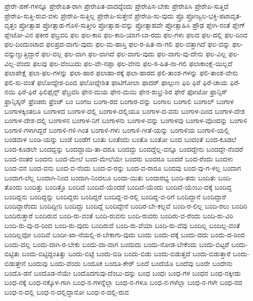{ಪ್ರೇರೇ-ಪಣೆ-ಗಳನ್ನೂ
ಪ್ರೇರೇಪಿತ-ರಾಗಿ
ಪ್ರೇರೇಪಿತ-ವಾದದ್ದೆಂದು
ಪ್ರೇರೇಪಿಸ-ಬೇಕು
ಪ್ರೇರೇಪಿಸಿ
ಪ್ರೇರೇಪಿ-ಸುತ್ತಿದೆ
ಪ್ರೇರೇಪಿ-ಸುತ್ತಿ-ರುವ-ವಳು
ಪ್ರೇರೇಪಿ-ಸುತ್ತಿಲ್ಲ
ಪ್ರೇರೇಪಿ-ಸುತ್ತೇನೆ
ಪ್ರೇರೇಪಿ-ಸು-ವುದು
ಪ್ರೊ
ಪ್ರೋಜ್ವಲ-ಭಕ್ತಿ-ಪಟಾವೃತ-ವೃತ್ತಂ
ಪ್ರೋತ್ಸಾಹ
ಪ್ರೋತ್ಸಾಹ-ಗೊಳಿ-ಸುತ್ತೀರಿ
ಪ್ರೋತ್ಸಾಹ-ವನ್ನು
ಪ್ರೋತ್ಸಾಹವೇ
ಪ್ರೋತ್ಸಾಹಿಸಿ
ಪ್ರೌಢ
ಪ್ಲೇಗಿ-ನಂತೆ
ಪ್ಲೇಗ್
ಪ್ಲೇಟೋ-ವಿನ
ಫಕೀರ
ಫಬ್ರವರಿ
ಫಲ
ಫಲ-ಕಾರಿ
ಫಲ-ಕಾರಿ-ಯಾಗ-ಬಾ-ರದು
ಫಲ-ಗಳು
ಫಲದ
ಫಲ-ದಲ್ಲಿ
ಫಲ-ದಿಂದ
ಫಲ-ದಿಂದುಂಟಾದ
ಫಲಪ್ರದ-ವಾಗು-ವುದು
ಫಲ-ಮ-ಹಾಸ್ತಿ
ಫಲ-ರ-ಹಿತ-ನಾ-ಗಲಿ
ಫಲ-ವತ್ತಾಗಿದೆ
ಫಲ-ವನ್ನು
ಫಲ-ವನ್ನುಣ್ಣುತ್ತಿದ್ದಾರೆ
ಫಲ-ವಲ್ಲ
ಫಲ-ವಾಗಿ
ಫಲ-ವಾಗಿದೆ
ಫಲ-ವಾಗು-ವುದು
ಫಲ-ವಾಗು-ವು-ದೇನು
ಫಲ-ವಿಲ್ಲ
ಫಲ-ವಿಲ್ಲ-ವೆಂದು
ಫಲವು
ಫಲ-ವೆಂಬುದು
ಫಲ-ವೇ-ನಪ್ಪಾ
ಫಲ-ವೇನು
ಫಲ-ಸ-ಹಿತ-ನಾ-ಗಲಿ
ಫಲಾಕಾಂಕ್ಷೆ-ಯಿಲ್ಲದೆ
ಫಲಾಪೇಕ್ಷೆ
ಫಲಾ-ಫಲ-ಗಳನ್ನು
ಫಲಾ-ಹಾರ
ಫಲಾಹಾ-ರಕ್ಕೆ
ಫಲಾ-ಹಾರದ
ಫಲಿ-ತಾಂಶ-ಗಳನ್ನು
ಫಲಿ-ತಾಂಶ-ವೇನು
ಫಲಿ-ಸು-ವಂತೆ
ಫಲೋದ್ದೇಶ-ದಿಂದ
ಫಲೋದ್ದೇಶಿತ
ಫಾಟಿಗೋಲಾ
ಫಾದರ್
ಫಾಲ್ಗುಣ
ಫಿರಿ
ಫಿರೆ
ಫಿರೆ-ಚಾಯ
ಫಿರೆ-ನಯಿ
ಫಿರೆ-ಫಿರೆ
ಫಿಲಿಫೈನ್ಸ್
ಫೆಬ್ರವರಿ
ಫೇನ-ಮಯ
ಫೇನ-ಮಯಿ
ಫೇನ-ಶುಭ್ರ-ಶಿರ
ಫೇರೆ
ಫೋಟೋ
ಫ್ರಾನ್ಸಿಸ್
ಫ್ರಾನ್ಸಿಸ್ಕನ್
ಫ್ರೆಂಚರು
ಫ್ರೆಂಚ್
ಬಂ
ಬಂಗಜ
ಬಂಗಾ-ರದ
ಬಂಗಾರ-ವನ್ನು
ಬಂಗಾಲ
ಬಂಗಾಲಿ
ಬಂಗಾಲ್
ಬಂಗಾಳ
ಬಂಗಾಳಕ್ಕಿಂತಲೂ
ಬಂಗಾಳದ
ಬಂಗಾಳ-ದಲ್ಲಿ
ಬಂಗಾಳ-ದಲ್ಲಿಯೂ
ಬಂಗಾಳ-ದ-ವನು
ಬಂಗಾಳ-ದಿಂದ
ಬಂಗಾಳ-ದೇಶ
ಬಂಗಾಳ-ದೇಶ-ದಲ್ಲಿ
ಬಂಗಾಳನ
ಬಂಗಾಳ-ನಿಗೆ
ಬಂಗಾಳನು
ಬಂಗಾಳ-ವನ್ನು
ಬಂಗಾಳವು
ಬಂಗಾಳ-ವೊಂದನ್ನು
ಬಂಗಾಳಿ
ಬಂಗಾಳಿ-ಗಳಾಗಿದ್ದರೆ
ಬಂಗಾಳಿ-ಗಳಿ-ಗಿಂತ
ಬಂಗಾಳಿ-ಗಳು
ಬಂಗಾಳಿ-ಗೀತೆ-ಯನ್ನು
ಬಂಗಾಳಿಯ
ಬಂಗಾಳಿ-ಯಲ್ಲಿ
ಬಂಡವಾಳ
ಬಂಡಿ-ಯನ್ನು
ಬಂಡೆ
ಬಂಡೆಗೆ
ಬಂತು
ಬಂತೆಂದು
ಬಂತೊ
ಬಂತೋ
ಬಂದ
ಬಂದಂತೆ
ಬಂದ-ಕೂಡಲೆ
ಬಂದ-ಕೂಡಲೇ
ಬಂದದ್ದನ್ನು
ಬಂದದ್ದಾಯಿ-ತಾ-ದರೂ
ಬಂದದ್ದು
ಬಂದದ್ದೆಲ್ಲ-ವನ್ನೂ
ಬಂದದ್ದೇನು
ಬಂದದ್ದೇ-ನೆಂದರೆ
ಬಂದ-ನಂತರ
ಬಂದನು
ಬಂದ-ಮೇಲೆ
ಬಂದ-ಮೇಲೆಯೇ
ಬಂದರು
ಬಂದರೂ
ಬಂದರೆ
ಬಂದ-ರೆಂದು
ಬಂದಳು
ಬಂದ-ವನ
ಬಂದ-ವನು
ಬಂದ-ವ-ನೆಂದು
ಬಂದ-ವ-ರನ್ನು
ಬಂದ-ವ-ರಾರೂ
ಬಂದವು
ಬಂದ-ವು-ಗ-ಳಲ್ಲ
ಬಂದಾಗ
ಬಂದಾಗ-ಲೆಲ್ಲ
ಬಂದಾಗಿ-ನಿಂದ
ಬಂದಾಗಿ-ನಿಂದಲೂ
ಬಂದಾ-ಯಿತು
ಬಂದಾರಭ್ಯ
ಬಂದಿ-ತದು
ಬಂದಿತು
ಬಂದಿ-ತೊಂದು
ಬಂದಿತ್ತು
ಬಂದಿತ್ತೊ
ಬಂದಿದೆ
ಬಂದಿದೆ-ಯೆಂದರೆ
ಬಂದಿದೆ-ಯೆಂದು
ಬಂದಿದೆ-ಯೆಂಬು-ದಕ್ಕೆ
ಬಂದಿದ್ದ
ಬಂದಿದ್ದನು
ಬಂದಿದ್ದನ್ನು
ಬಂದಿದ್ದರು
ಬಂದಿದ್ದರೆ
ಬಂದಿದ್ದ-ವ-ರಲ್ಲಿ
ಬಂದಿದ್ದ-ವ-ರಿಗೆ
ಬಂದಿದ್ದಾನೆ
ಬಂದಿದ್ದಾರೆ
ಬಂದಿದ್ದಾರೆಂದು
ಬಂದಿದ್ದೀರಿ
ಬಂದಿದ್ದು
ಬಂದಿದ್ದೆ
ಬಂದಿದ್ದೇನೆ
ಬಂದಿರ-ಬೇ-ಕಲ್ಲವೆ
ಬಂದಿ-ರ-ಲಿಲ್ಲ
ಬಂದಿ-ರಲು
ಬಂದಿರಿ
ಬಂದಿರುತ್ತಾರೆ
ಬಂದಿರುವ
ಬಂದಿ-ರು-ವಂತೆ
ಬಂದಿ-ರುವನು
ಬಂದಿ-ರುವರು
ಬಂದಿರು-ವ-ರೆಂದು
ಬಂದಿ-ರು-ವಿರಿ
ಬಂದಿ-ರು-ವು-ದ-ರಿಂದ
ಬಂದಿ-ರು-ವುದು
ಬಂದಿರುವೆ
ಬಂದಿ-ರು-ವೆಯಾ
ಬಂದಿ-ರು-ವೆವು
ಬಂದಿಲ್ಲ
ಬಂದಿಲ್ಲ-ವಂತೆ
ಬಂದಿಲ್ಲವೋ
ಬಂದಿವೆ
ಬಂದೀ-ಖಾ-ನೆಯಲ್ಲಿ-ರ-ಬೇಕಾಗು-ವುದು
ಬಂದು
ಬಂದು-ದಕ್ಕೆ
ಬಂದು-ದದು
ಬಂದು-ದ-ರಿಂದ
ಬಂದು-ದಲ್ಲ
ಬಂದು-ದಾಗಿ-ರ-ಬೇಕು
ಬಂದು-ದಾ-ವಾಗ
ಬಂದುದು
ಬಂದು-ನೋಡ-ಬೇಕೆಂದು
ಬಂದು-ಬಿಟ್ಟರೆ
ಬಂದು-ಬಿಟ್ಟಿತು
ಬಂದು-ಬಿಟ್ಟಿದ್ದಂತಿತ್ತು
ಬಂದು-ಬಿಟ್ಟೆ
ಬಂದು-ಬಿಡಿ
ಬಂದು-ಬಿಡು
ಬಂದು-ಬಿಡುತ್ತದೆ
ಬಂದು-ಬಿಡುತ್ತಾರೆ
ಬಂದು-ಬಿಡುತ್ತೇನೆ
ಬಂದುವು
ಬಂದು-ವೆಂದು
ಬಂದೂಕ
ಬಂದೂ-ಕೇರ್
ಬಂದೆ
ಬಂದೆಯೊ
ಬಂದೆವು
ಬಂದೇ
ಬಂದೇನು
ಬಂದೊ-ಡನೆ
ಬಂದೊಡ-ನೆಯೇ
ಬಂದೊದಗುವು-ದೆಂಬು-ದನ್ನು
ಬಂಧ
ಬಂಧಃ
ಬಂಧ-ಗಳ
ಬಂಧನ
ಬಂಧ-ನಕ್ಕೀಡು
ಬಂಧ-ನಕ್ಕೆ
ಬಂಧ-ನಕ್ಕೊಳ-ಗಾಗಿ
ಬಂಧ-ನ-ಗಳನ್ನೆಲ್ಲಾ
ಬಂಧ-ನ-ಗಳೂ
ಬಂಧ-ನ-ಗಳೆಲ್ಲಾ
ಬಂಧ-ನ-ಗಳೇ
ಬಂಧ-ನದ
ಬಂಧ-ನ-ದಲ್ಲಿ
ಬಂಧ-ನ-ದಲ್ಲಿದ್ದಾನೋ
ಬಂಧ-ನ-ದಲ್ಲಿ-ರುವ
}
